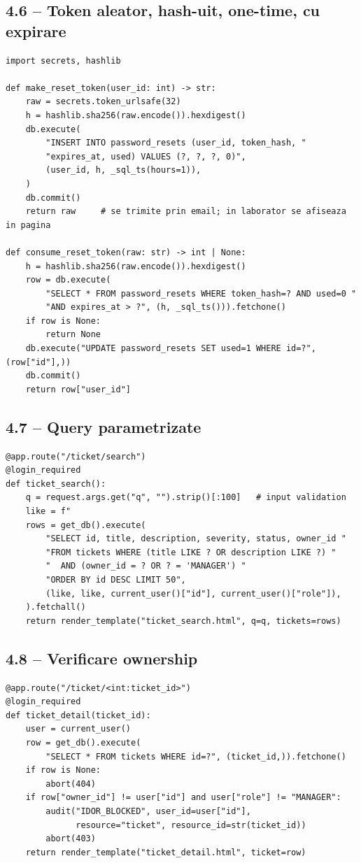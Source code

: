 \documentclass[12pt,a4paper]{article}
\begin{document}
\subsection{4.6 -- Token aleator, hash-uit, one-time, cu expirare}
\begin{lstlisting}[style=py, caption={Reset token securizat}]
import secrets, hashlib

def make_reset_token(user_id: int) -> str:
    raw = secrets.token_urlsafe(32)
    h = hashlib.sha256(raw.encode()).hexdigest()
    db.execute(
        "INSERT INTO password_resets (user_id, token_hash, "
        "expires_at, used) VALUES (?, ?, ?, 0)",
        (user_id, h, _sql_ts(hours=1)),
    )
    db.commit()
    return raw     # se trimite prin email; in laborator se afiseaza in pagina

def consume_reset_token(raw: str) -> int | None:
    h = hashlib.sha256(raw.encode()).hexdigest()
    row = db.execute(
        "SELECT * FROM password_resets WHERE token_hash=? AND used=0 "
        "AND expires_at > ?", (h, _sql_ts())).fetchone()
    if row is None:
        return None
    db.execute("UPDATE password_resets SET used=1 WHERE id=?", (row["id"],))
    db.commit()
    return row["user_id"]
\end{lstlisting}

\subsection{4.7 -- Query parametrizate}
\begin{lstlisting}[style=py, caption={Search securizat}]
@app.route("/ticket/search")
@login_required
def ticket_search():
    q = request.args.get("q", "").strip()[:100]   # input validation
    like = f"
    rows = get_db().execute(
        "SELECT id, title, description, severity, status, owner_id "
        "FROM tickets WHERE (title LIKE ? OR description LIKE ?) "
        "  AND (owner_id = ? OR ? = 'MANAGER') "
        "ORDER BY id DESC LIMIT 50",
        (like, like, current_user()["id"], current_user()["role"]),
    ).fetchall()
    return render_template("ticket_search.html", q=q, tickets=rows)
\end{lstlisting}

\subsection{4.8 -- Verificare ownership}
\begin{lstlisting}[style=py, caption={IDOR prevention pe \texttt{/ticket/<id>}}]
@app.route("/ticket/<int:ticket_id>")
@login_required
def ticket_detail(ticket_id):
    user = current_user()
    row = get_db().execute(
        "SELECT * FROM tickets WHERE id=?", (ticket_id,)).fetchone()
    if row is None:
        abort(404)
    if row["owner_id"] != user["id"] and user["role"] != "MANAGER":
        audit("IDOR_BLOCKED", user_id=user["id"],
              resource="ticket", resource_id=str(ticket_id))
        abort(403)
    return render_template("ticket_detail.html", ticket=row)
\end{lstlisting}
\end{document}
